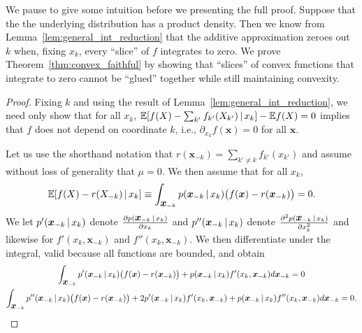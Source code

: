 We pause to give some intuition before we presenting the full proof.
Suppose that the the underlying distribution has a product density.
Then we know from Lemma~\ref{lem:general_int_reduction} that the
additive approximation zeroes out $k$ when, fixing $x_k$, every
``slice'' of $f$ integrates to zero. We prove
Theorem~\ref{thm:convex_faithful} by showing that ``slices'' of convex
functions that integrate to zero cannot be ``glued'' together while
still maintaining convexity.


\begin{proof}

Fixing $k$ and using the result of
Lemma~\ref{lem:general_int_reduction}, 
we need only show that for all $x_k$, $ {\mathbb E}[ f(X) - \sum_{k'}
f_{k'}(X_{k'}) {\,|\,} x_k] - {\mathbb E} f(X) = 0 $ 
implies that $f$ does not depend on coordinate $k$, i.e., 
$\partial_{x_k} f(\mathbf{x}) = 0$ for all $\mathbf{x}$.

Let us use the shorthand notation that $r(\mathbf{x}_{-k}) = \sum_{k'
  \neq k} f_{k'}(x_{k'})$ and assume without loss of generality that
$\mu = 0$. We then assume that for all $x_k$,
\begin{equation}
 {\mathbb E}[ f(X) - r(X_{-k})  {\,|\,} x_k] \equiv 
 \int_{\mbox{\boldmath $x$}_{-k}}  p(\mbox{\boldmath $x$}_{-k} {\,|\,} x_k ) 
 \big(f(\mbox{\boldmath $x$}) - r(\mbox{\boldmath $x$}_{-k}) \big) = 0.
\end{equation}
We let $p'(\mbox{\boldmath $x$}_{-k} {\,|\,} x_k)$ denote 
$\frac{\partial p(\mbox{\boldmath $x$}_{-k} {\,|\,} x_k)}{\partial x_k}$ and 
$p''(\mbox{\boldmath $x$}_{-k} {\,|\,} x_k)$ denote 
$\frac{\partial^2 p(\mbox{\boldmath $x$}_{-k} {\,|\,} x_k)}{\partial x_k^2}$ and
likewise for $f'(x_k, \mathbf{x}_{-k})$ and $f''(x_k,
\mathbf{x}_{-k})$. We then differentiate under the integral, valid
because all functions are bounded, and obtain
\begin{gather}
\int_{\mbox{\boldmath $x$}_{-k}} p'(\mbox{\boldmath $x$}_{-k} {\,|\,} x_k) 
\big( f(\mbox{\boldmath $x$}) - r(\mbox{\boldmath $x$}_{-k}) \big) + 
p(\mbox{\boldmath $x$}_{-k} {\,|\,} x_k) f'(x_k, \mbox{\boldmath $x$}_{-k}) d \mbox{\boldmath $x$}_{-k}  = 0 
\label{eqn:integral1a} \\
\int_{\mbox{\boldmath $x$}_{-k}} p''(\mbox{\boldmath $x$}_{-k} {\,|\,} x_k) 
\big( f(\mbox{\boldmath $x$}) - r(\mbox{\boldmath $x$}_{-k}) \big)  + 2 p'(\mbox{\boldmath $x$}_{-k} {\,|\,} x_k) f'(x_k, \mbox{\boldmath $x$}_{-k}) +
p(\mbox{\boldmath $x$}_{-k} {\,|\,} x_k) f''(x_k, \mbox{\boldmath $x$}_{-k}) d\mbox{\boldmath $x$}_{-k}  = 0 .
\end{gather}


\end{proof}
